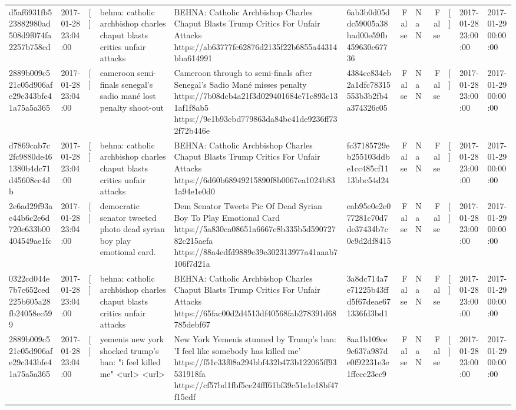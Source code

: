 \begin{tabular}{llllllrlrlll}
d5af6931fb523882980ad508d9f074fa2257b758cd & 2017-01-28 23:04:00 & [] & behna: catholic archbishop charles chaput blasts critics unfair attacks & BEHNA: Catholic Archbishop Charles Chaput Blasts Trump Critics For Unfair Attacks https://ab63777fc62876d2135f22b6855a44314bba614991 & 6ab3b0d05ddc59005a38bad00e59fb459630c67736 & False & NaN & False & [] & 2017-01-28 23:00:00 & 2017-01-29 00:00:00 \\
2889b009c521c05d906afe29c343bfe41a75a5a365 & 2017-01-28 23:04:00 & [] & cameroon semi-finals senegal's sadio mané lost penalty shoot-out & Cameroon through to semi-finals after Senegal’s Sadio Mané misses penalty https://7b08dcb4a21f3d029401684e71c893c131af1f8ab5 https://9e1b93cbd779863da84bc41de9236ff732f72b446e & 4384cc834eb2a1dfc78315553b3b2fb4a374326c05 & False & NaN & False & [] & 2017-01-28 23:00:00 & 2017-01-29 00:00:00 \\
d7869cab7c2fc9880de461380b4dc71d45608cc4db & 2017-01-28 23:04:00 & [] & behna: catholic archbishop charles chaput blasts critics unfair attacks & BEHNA: Catholic Archbishop Charles Chaput Blasts Trump Critics For Unfair Attacks https://6d60b68949215890f8b0067ea1024b831a94e1e0d0 & fc37185729eb255103ddbe1cc485cf1113bbc54d24 & False & NaN & False & [] & 2017-01-28 23:00:00 & 2017-01-29 00:00:00 \\
2e6ad29f93ae44b6c2e6d720c633b00404549ae1fc & 2017-01-28 23:04:00 & [] & democratic senator tweeted photo dead syrian boy play emotional card. & Dem Senator Tweets Pic Of Dead Syrian Boy To Play Emotional Card https://5a830ca08651a6667c8b335b5d59072782c215aefa https://88a4cdfd9889e39e302313977a41aaab7106f7d21a & eab95e0c2e077281c70d7de37434b7c0c9d2df8415 & False & NaN & False & [] & 2017-01-28 23:00:00 & 2017-01-29 00:00:00 \\
0322cd044e7b7c652ced225b605a28fb24058ec599 & 2017-01-28 23:04:00 & [] & behna: catholic archbishop charles chaput blasts critics unfair attacks & BEHNA: Catholic Archbishop Charles Chaput Blasts Trump Critics For Unfair Attacks https://65fac00d2d4513df40568fab278391d68785debf67 & 3a8dc714a7e71225b43ffd5f67deae671336fd3bd1 & False & NaN & False & [] & 2017-01-28 23:00:00 & 2017-01-29 00:00:00 \\
2889b009c521c05d906afe29c343bfe41a75a5a365 & 2017-01-28 23:04:00 & [] & yemenis new york shocked trump's ban: "i feel killed me" <url> <url> & New York Yemenis stunned by Trump's ban: 'I feel like somebody has killed me' https://f51c33f08a294bbf432b473b122065ff93531918fa https://cf57bd1fbf5ce24fff61bf39c51e1e18bf47f15cdf & 8aa1b109ee9c637a987de0f92231e3e1ffcce23ec9 & False & NaN & False & [] & 2017-01-28 23:00:00 & 2017-01-29 00:00:00 \\

\end{tabular}
